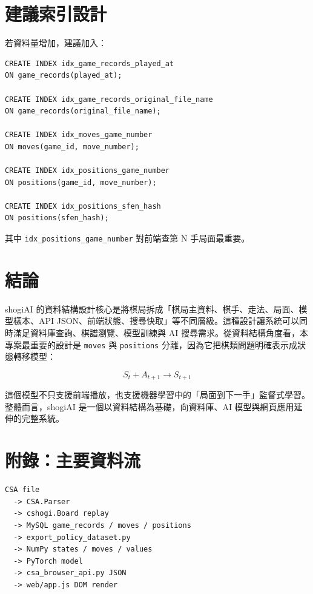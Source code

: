 \documentclass[12pt,a4paper,fontset=none]{ctexart}
\begin{document}
\section{建議索引設計}

若資料量增加，建議加入：

\begin{lstlisting}[style=cmd]
CREATE INDEX idx_game_records_played_at
ON game_records(played_at);

CREATE INDEX idx_game_records_original_file_name
ON game_records(original_file_name);

CREATE INDEX idx_moves_game_number
ON moves(game_id, move_number);

CREATE INDEX idx_positions_game_number
ON positions(game_id, move_number);

CREATE INDEX idx_positions_sfen_hash
ON positions(sfen_hash);
\end{lstlisting}

其中 \texttt{idx\_positions\_game\_number} 對前端查第 N 手局面最重要。

\section{結論}

shogiAI 的資料結構設計核心是將棋局拆成「棋局主資料、棋手、走法、局面、模型樣本、API JSON、前端狀態、搜尋快取」等不同層級。這種設計讓系統可以同時滿足資料庫查詢、棋譜瀏覽、模型訓練與 AI 搜尋需求。從資料結構角度看，本專案最重要的設計是 \texttt{moves} 與 \texttt{positions} 分離，因為它把棋類問題明確表示成狀態轉移模型：

\[
S_t + A_{t+1} \rightarrow S_{t+1}
\]

這個模型不只支援前端播放，也支援機器學習中的「局面到下一手」監督式學習。整體而言，shogiAI 是一個以資料結構為基礎，向資料庫、AI 模型與網頁應用延伸的完整系統。

\appendix
\section{附錄：主要資料流}

\begin{lstlisting}[style=cmd]
CSA file
  -> CSA.Parser
  -> cshogi.Board replay
  -> MySQL game_records / moves / positions
  -> export_policy_dataset.py
  -> NumPy states / moves / values
  -> PyTorch model
  -> csa_browser_api.py JSON
  -> web/app.js DOM render
\end{lstlisting}
\end{document}
